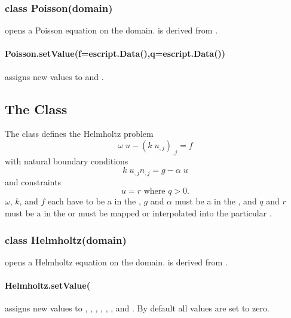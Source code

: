 \subsubsection*{class Poisson(domain)}
opens a Poisson equation on the \Domain domain. \Poisson is derived from \LinearPDE.

\paragraph{Poisson.setValue(f=escript.Data(),q=escript.Data())}
assigns new values to  and .


\subsection{The \Helmholtz Class}
The \Helmholtz class defines the Helmholtz problem
\begin{equation}\label{HZ.1}
\omega \; u - (k\; u_{,j})_{,j} = f
\end{equation}
with natural boundary conditions
\begin{equation}\label{HZ.2}
k\; u_{,j} n_{,j} = g- \alpha \; u
\end{equation}
and constraints
\begin{equation}\label{HZ.3}
u=r \mbox{ where } q>0 .
\end{equation}
$\omega$, $k$, and $f$ each have to be a \Scalar in the \Function, $g$ and
$\alpha$ must be a \Scalar in the \FunctionOnBoundary, and $q$ and $r$ must be
a \Scalar in the \SolutionFS or must be mapped or interpolated into the
particular \FunctionSpace.

\subsubsection*{class Helmholtz(domain)}
opens a Helmholtz equation on the \Domain domain. \Helmholtz is derived from \LinearPDE.

\paragraph{Helmholtz.setValue(
     }
assigns new values to , , , , ,
, and . By default all values are set to zero.


